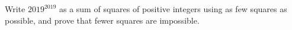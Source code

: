 Write $2019^{2019}$ as a sum of squares of positive integers using as few squares as possible, and prove that fewer squares are impossible.
